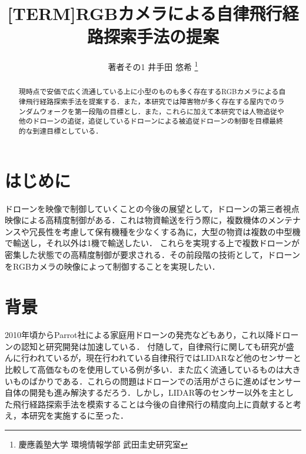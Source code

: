 \documentclass[a4j,10pt]{jsarticle}
\begin{document}

\title{[TERM]RGBカメラによる自律飛行経路探索手法の提案}

\author{
    著者その1 {井手田 悠希} \thanks{慶應義塾大学 環境情報学部 武田圭史研究室}
}

\begin{abstract}
現時点で安価で広く流通している上に小型のものも多く存在するRGBカメラによる自律飛行経路探索手法を提案する．また，本研究では障害物が多く存在する屋内でのランダムウォークを第一段階の目標とし．また，これらに加えて本研究では人物追従や他のドローンの追従，追従しているドローンによる被追従ドローンの制御を目標最終的な到達目標としている．
\end{abstract}

\maketitle
\thispagestyle{empty}

\section{はじめに}
ドローンを映像で制御していくことの今後の展望として，ドローンの第三者視点映像による高精度制御がある．これは物資輸送を行う際に，複数機体のメンテナンスや冗長性を考慮して保有機種を少なくする為に，大型の物資は複数の中型機で輸送し，それ以外は1機で輸送したい．
これらを実現する上で複数ドローンが密集した状態での高精度制御が要求される．その前段階の技術として，ドローンをRGBカメラの映像によって制御することを実現したい．

\section{背景}
2010年頃からParrot社による家庭用ドローンの発売などもあり，これ以降ドローンの認知と研究開発は加速している．
付随して，自律飛行に関しても研究が盛んに行われているが，現在行われている自律飛行ではLIDARなど他のセンサーと比較して高価なものを使用している例が多い．また広く流通しているものは大きいものばかりである．これらの問題はドローンでの活用がさらに進めばセンサー自体の開発も進み解決するだろう．しかし，LIDAR等のセンサー以外を主とした飛行経路探索手法を模索することは今後の自律飛行の精度向上に貢献すると考え，本研究を実施するに至った．
\end{document}
